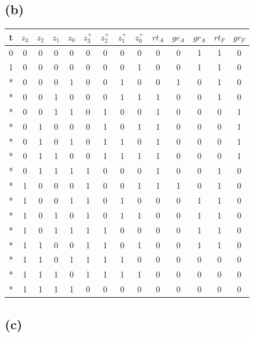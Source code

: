 \documentclass[12pt]{article}
\begin{document}
\subsection{(b)}
\begin{tabular}{c|c c c c||c c c c|c c c|c c}
t & \(z_3\) & \(z_2\) & \(z_1\) & \(z_0\) & \(z_3^+\) & \(z_2^+\) &
    \(z_1^+\) & \(z_0^+\) & \(rt_A\) & \(ge_A\) & \(gr_A\) & \(rt_F\)
    & \(gr_F\) \\
\hline
  0 & 0 & 0 & 0 & 0 & 0 & 0 & 0 & 0 & 0 & 0 & 1 & 1 & 0 \\
  1 & 0 & 0 & 0 & 0 & 0 & 0 & 0 & 1 & 0 & 0 & 1 & 1 & 0 \\
  * & 0 & 0 & 0 & 1 & 0 & 0 & 1 & 0 & 0 & 1 & 0 & 1 & 0 \\
  * & 0 & 0 & 1 & 0 & 0 & 0 & 1 & 1 & 1 & 0 & 0 & 1 & 0 \\
  * & 0 & 0 & 1 & 1 & 0 & 1 & 0 & 0 & 1 & 0 & 0 & 0 & 1 \\
  * & 0 & 1 & 0 & 0 & 0 & 1 & 0 & 1 & 1 & 0 & 0 & 0 & 1 \\
  * & 0 & 1 & 0 & 1 & 0 & 1 & 1 & 0 & 1 & 0 & 0 & 0 & 1 \\
  * & 0 & 1 & 1 & 0 & 0 & 1 & 1 & 1 & 1 & 0 & 0 & 0 & 1 \\
  * & 0 & 1 & 1 & 1 & 1 & 0 & 0 & 0 & 1 & 0 & 0 & 1 & 0 \\
  * & 1 & 0 & 0 & 0 & 1 & 0 & 0 & 1 & 1 & 1 & 0 & 1 & 0 \\
  * & 1 & 0 & 0 & 1 & 1 & 0 & 1 & 0 & 0 & 0 & 1 & 1 & 0 \\
  * & 1 & 0 & 1 & 0 & 1 & 0 & 1 & 1 & 0 & 0 & 1 & 1 & 0 \\
  * & 1 & 0 & 1 & 1 & 1 & 1 & 0 & 0 & 0 & 0 & 1 & 1 & 0 \\
  * & 1 & 1 & 0 & 0 & 1 & 1 & 0 & 1 & 0 & 0 & 1 & 1 & 0 \\
  * & 1 & 1 & 0 & 1 & 1 & 1 & 1 & 0 & 0 & 0 & 0 & 0 & 0 \\
  * & 1 & 1 & 1 & 0 & 1 & 1 & 1 & 1 & 0 & 0 & 0 & 0 & 0 \\
  * & 1 & 1 & 1 & 1 & 0 & 0 & 0 & 0 & 0 & 0 & 0 & 0 & 0 \\
\end{tabular}
  
\subsection{(c)}
\end{document}
